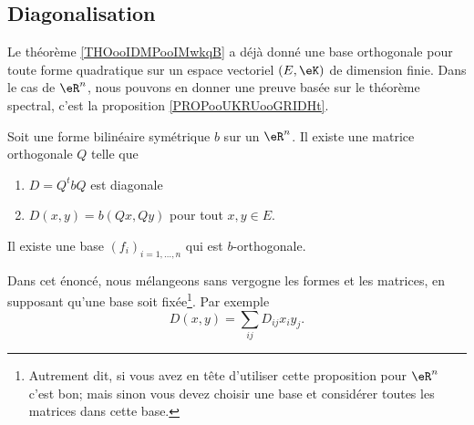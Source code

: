 \subsection{Diagonalisation}

Le théorème \ref{THOooIDMPooIMwkqB} a déjà donné une base orthogonale pour toute forme quadratique sur un espace vectoriel \( (E,\eK)\) de dimension finie. Dans le cas de \( \eR^n\), nous pouvons en donner une preuve basée sur le théorème spectral, c'est la proposition \ref{PROPooUKRUooGRIDHt}.

\begin{proposition}     \label{PROPooUKRUooGRIDHt}
    Soit une forme bilinéaire symétrique \( b\) sur un \( \eR^n\). Il existe une matrice orthogonale \( Q\) telle que 
    \begin{enumerate}
        \item
            \( D=Q^tbQ\) est diagonale
        \item
            \( D(x,y)=b(Qx,Qy)\) pour tout \( x,y\in E\).
    \end{enumerate}

    Il existe une base \( (f_i)_{i=1,\ldots, n}\) qui est \( b\)-orthogonale.

    Dans cet énoncé, nous mélangeons sans vergogne les formes et les matrices, en supposant qu'une base soit fixée\footnote{Autrement dit, si vous avez en tête d'utiliser cette proposition pour \( \eR^n\) c'est bon; mais sinon vous devez choisir une base et considérer toutes les matrices dans cette base.}. Par exemple
    \begin{equation}
        D(x,y)=\sum_{ij}D_{ij}x_iy_j.
    \end{equation}
\end{proposition}

